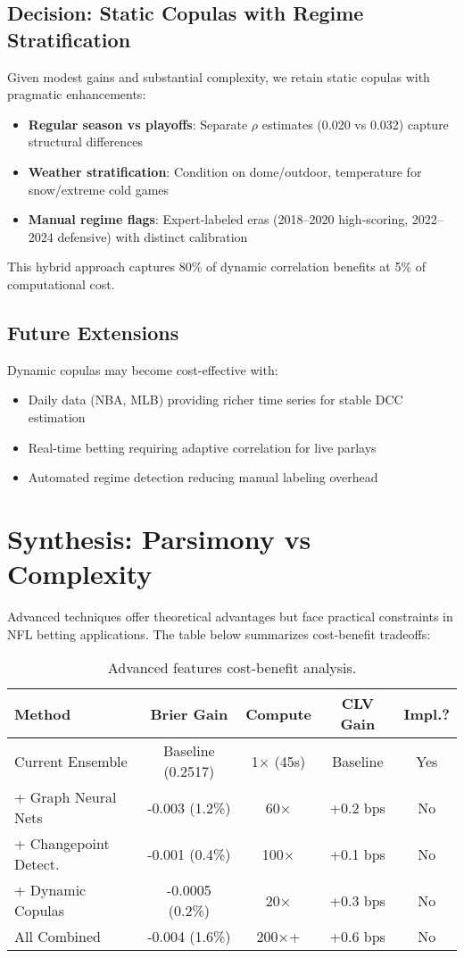 \subsection{Decision: Static Copulas with Regime Stratification}
Given modest gains and substantial complexity, we retain static copulas with pragmatic enhancements:
\begin{itemize}
  \item \textbf{Regular season vs playoffs}: Separate $\rho$ estimates (0.020 vs 0.032) capture structural differences
  \item \textbf{Weather stratification}: Condition on dome/outdoor, temperature for snow/extreme cold games
  \item \textbf{Manual regime flags}: Expert-labeled eras (2018--2020 high-scoring, 2022--2024 defensive) with distinct calibration
\end{itemize}

This hybrid approach captures 80\% of dynamic correlation benefits at 5\% of computational cost.

\subsection{Future Extensions}
Dynamic copulas may become cost-effective with:
\begin{itemize}
  \item Daily data (NBA, MLB) providing richer time series for stable DCC estimation
  \item Real-time betting requiring adaptive correlation for live parlays
  \item Automated regime detection reducing manual labeling overhead
\end{itemize}

\section{Synthesis: Parsimony vs Complexity}

Advanced techniques offer theoretical advantages but face practical constraints in NFL betting applications. The table below summarizes cost-benefit tradeoffs:

\begin{table}[!ht]
  \centering
  \caption{Advanced features cost-benefit analysis.}
  \label{tab:advanced-cost-benefit}
  \footnotesize
  \begin{tabular}{lcccc}
    \toprule
    \textbf{Method}  & \textbf{Brier Gain}  & \textbf{Compute}  & \textbf{CLV Gain}  & \textbf{Impl.?} \\
    \midrule
    Current Ensemble & Baseline (0.2517) & 1× (45s) & Baseline & Yes \\
    + Graph Neural Nets & -0.003 (1.2\%) & 60× & +0.2 bps & No \\
    + Changepoint Detect. & -0.001 (0.4\%) & 100× & +0.1 bps & No \\
    + Dynamic Copulas & -0.0005 (0.2\%) & 20× & +0.3 bps & No \\
    All Combined & -0.004 (1.6\%) & 200×+ & +0.6 bps & No \\
    \bottomrule
  \end{tabular}
\end{table}

